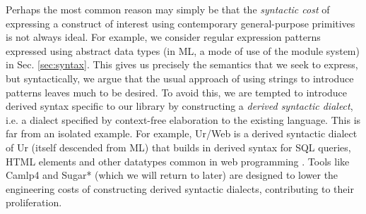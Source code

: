 Perhaps the most common  reason may simply be that the \emph{syntactic cost} of expressing a construct of interest using contemporary general-purpose primitives is not always ideal. %
For example,  we consider regular expression patterns expressed using abstract data types (in ML, a mode of use of the module system) in Sec. \ref{sec:syntax}. This  gives  us precisely the semantics that we seek to express, but syntactically, we argue that the usual approach of using strings to introduce patterns leaves much to be desired. To avoid this, we are tempted to introduce derived syntax specific to our library by constructing a \emph{derived syntactic dialect}, i.e. a dialect specified by context-free elaboration to the existing language. This is far from an isolated example. For example, Ur/Web is a  derived syntactic dialect of Ur (itself descended from ML) that builds in derived syntax for SQL queries, HTML elements and other datatypes common in web programming \cite{conf/popl/Chlipala15}. %
Tools like Camlp4 \cite{ocaml-manual} and Sugar* \cite{erdweg2011sugarj,erdweg2013framework} (which we will return to later) are designed to lower the engineering costs of constructing derived syntactic dialects, contributing to their proliferation.%


